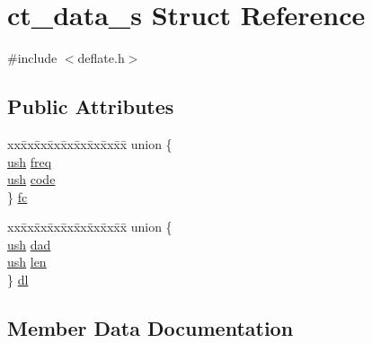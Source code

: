 \hypertarget{structct__data__s}{}\section{ct\+\_\+data\+\_\+s Struct Reference}
\label{structct__data__s}


{\ttfamily \#include $<$deflate.\+h$>$}

\subsection*{Public Attributes}
\begin{DoxyCompactItemize}
\item 
\begin{tabbing}
xx\=xx\=xx\=xx\=xx\=xx\=xx\=xx\=xx\=\kill
union \{\\
\>\hyperlink{zutil_8h_a3754180d606d4ed15468d15d9665aa2e}{ush} \hyperlink{structct__data__s_a67cd3c3267ba768c4494b36d5929c4bf}{freq}\\
\>\hyperlink{zutil_8h_a3754180d606d4ed15468d15d9665aa2e}{ush} \hyperlink{structct__data__s_a242f709ab288db2d155e28ce98c510c5}{code}\\
\} \hyperlink{structct__data__s_ab7571b35d9adc3adbd54a477d6bd3af3}{fc}\\

\end{tabbing}\item 
\begin{tabbing}
xx\=xx\=xx\=xx\=xx\=xx\=xx\=xx\=xx\=\kill
union \{\\
\>\hyperlink{zutil_8h_a3754180d606d4ed15468d15d9665aa2e}{ush} \hyperlink{structct__data__s_a73955d00dbdac5ad4027804a00726bfa}{dad}\\
\>\hyperlink{zutil_8h_a3754180d606d4ed15468d15d9665aa2e}{ush} \hyperlink{structct__data__s_ad7f6929b2907e046dfbc8f091b494cfb}{len}\\
\} \hyperlink{structct__data__s_ad148c8eddd237b011ffcd2d569a4cc94}{dl}\\

\end{tabbing}\end{DoxyCompactItemize}


\subsection{Member Data Documentation}
\hypertarget{structct__data__s_a242f709ab288db2d155e28ce98c510c5}{}
